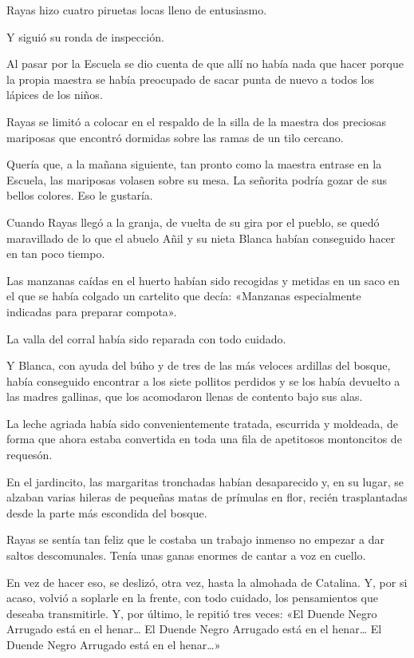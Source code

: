 \documentclass{barcodevapor3pags}
\begin{document}
Rayas hizo cuatro piruetas locas lleno de entusiasmo.

Y siguió su ronda de inspección.

Al pasar por la Escuela se dio cuenta de que allí no había nada que
hacer porque la propia maestra se había preocupado de sacar punta de
nuevo a todos los lápices de los niños.

Rayas se limitó a colocar en el respaldo de la silla de la maestra dos
preciosas mariposas que encontró dormidas sobre las ramas de un tilo
cercano.

Quería que, a la mañana siguiente, tan pronto como la maestra entrase en
la Escuela, las mariposas volasen sobre su mesa. La señorita podría
gozar de sus bellos colores. Eso le gustaría.

Cuando Rayas llegó a la granja, de vuelta de su gira por el pueblo, se
quedó maravillado de lo que el abuelo Añil y su nieta Blanca habían
conseguido hacer en tan poco tiempo.

Las manzanas caídas en el huerto habían sido recogidas y metidas en un
saco en el que se había colgado un cartelito que decía: «Manzanas
especialmente indicadas para preparar compota».

La valla del corral había sido reparada con todo cuidado.

Y Blanca, con ayuda del búho y de tres de las más veloces ardillas del
bosque, había conseguido encontrar a los siete pollitos perdidos y se
los había devuelto a las madres gallinas, que los acomodaron llenas de
contento bajo sus alas.

La leche agriada había sido convenientemente tratada, escurrida y
moldeada, de forma que ahora estaba convertida en toda una fila de
apetitosos montoncitos de requesón.

En el jardincito, las margaritas tronchadas habían desaparecido y, en su
lugar, se alzaban varias hileras de pequeñas matas de prímulas en flor,
recién trasplantadas desde la parte más escondida del bosque.

Rayas se sentía tan feliz que le costaba un trabajo inmenso no empezar a
dar saltos descomunales. Tenía unas ganas enormes de cantar a voz en
cuello.

En vez de hacer eso, se deslizó, otra vez, hasta la almohada de
Catalina. Y, por si acaso, volvió a soplarle en la frente, con todo
cuidado, los pensamientos que deseaba transmitirle. Y, por último, le
repitió tres veces: «El Duende Negro Arrugado está en el henar\ldots{}
El Duende Negro Arrugado está en el henar\ldots{} El Duende Negro
Arrugado está en el henar\ldots»
\end{document}
